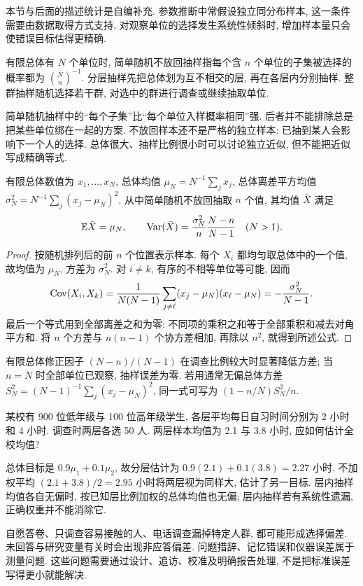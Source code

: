 本节与后面的描述统计是自编补充. 参数推断中常假设独立同分布样本, 这一条件需要由数据取得方式支持. 对观察单位的选择发生系统性倾斜时, 增加样本量只会使错误目标估得更精确.

\begin{definition}
有限总体有 $N$ 个单位时, 简单随机不放回抽样指每个含 $n$ 个单位的子集被选择的概率都为 $\binom Nn^{-1}$. 分层抽样先把总体划为互不相交的层, 再在各层内分别抽样. 整群抽样随机选择若干群, 对选中的群进行调查或继续抽取单位.
\end{definition}
简单随机抽样中的“每个子集”比“每个单位入样概率相同”强. 后者并不能排除总是把某些单位绑在一起的方案. 不放回样本还不是严格的独立样本: 已抽到某人会影响下一个人的选择. 总体很大、抽样比例很小时可以讨论独立近似, 但不能把近似写成精确等式.

\begin{proposition}
有限总体数值为 $x_1,\ldots,x_N$, 总体均值 $\mu_N=N^{-1}\sum_jx_j$, 总体离差平方均值 $\sigma_N^2=N^{-1}\sum_j(x_j-\mu_N)^2$. 从中简单随机不放回抽取 $n$ 个值, 其均值 $\bar X$ 满足
\[
 \mathbb E\bar X=\mu_N,\qquad
 \operatorname{Var}(\bar X)=\frac{\sigma_N^2}{n}\frac{N-n}{N-1}\quad(N>1).
\]
\end{proposition}
\begin{proof}
按随机排列后的前 $n$ 个位置表示样本. 每个 $X_i$ 都均匀取总体中的一个值, 故均值为 $\mu_N$, 方差为 $\sigma_N^2$. 对 $i\ne k$, 有序的不相等单位等可能, 因而
\[
 \operatorname{Cov}(X_i,X_k)=\frac{1}{N(N-1)}\sum_{j\ne\ell}(x_j-\mu_N)(x_\ell-\mu_N)
 =-\frac{\sigma_N^2}{N-1}.
\]
最后一个等式用到全部离差之和为零: 不同项的乘积之和等于全部乘积和减去对角平方和. 将 $n$ 个方差与 $n(n-1)$ 个协方差相加, 再除以 $n^2$, 就得到所述公式.
\end{proof}
有限总体修正因子 $ (N-n)/(N-1)$ 在调查比例较大时显著降低方差; 当 $n=N$ 时全部单位已观察, 抽样误差为零. 若用通常无偏总体方差 $S_N^2=(N-1)^{-1}\sum_j(x_j-\mu_N)^2$, 同一式可写为 $(1-n/N)S_N^2/n$.

\begin{example}
某校有 900 位低年级与 100 位高年级学生, 各层平均每日自习时间分别为 2 小时和 4 小时. 调查时两层各选 50 人. 两层样本均值为 2.1 与 3.8 小时, 应如何估计全校均值?
\end{example}
\begin{solution}
总体目标是 $0.9\mu_1+0.1\mu_2$, 故分层估计为 $0.9(2.1)+0.1(3.8)=2.27$ 小时. 不加权平均 $(2.1+3.8)/2=2.95$ 小时将两层视为同样大, 估计了另一目标. 层内抽样均值各自无偏时, 按已知层比例加权的总体均值也无偏; 层内抽样若有系统性遗漏, 正确权重并不能消除它.
\end{solution}
自愿答卷、只调查容易接触的人、电话调查漏掉特定人群, 都可能形成选择偏差. 未回答与研究变量有关时会出现非应答偏差. 问题措辞、记忆错误和仪器误差属于测量问题. 这些问题需要通过设计、追访、校准及明确报告处理, 不是把标准误差写得更小就能解决.

